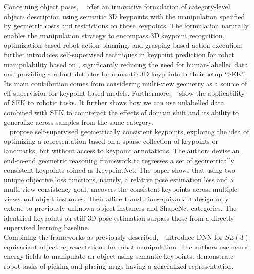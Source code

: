 Concerning object poses, \citeauthor{kpam}~\cite{kpam} offer an innovative formulation of category-level objects description
using semantic 3D keypoints with the manipulation specified by geometric costs and restrictions on those keypoints.
The formulation naturally enables the manipulation strategy to encompass 3D keypoint recognition,
optimization-based robot action planning, and grasping-based action execution.
\citeauthor{vecerik2020s3k}~\cite{vecerik2020s3k} further introduces self-supervised techniques in
keypoint prediction for robot manipulability based on \parencites{yen2020learning}{sermanet2017time}{li2018deepim}{xiang2017posecnn},
significantly reducing the need for human-labelled data and providing a robust detector for semantic 3D keypoints in their setup ``SEK''.
Its main contribution comes from considering multi-view geometry as a source of elf-supervision for keypoint-based models.
Furthermore, \citeauthor{vecerik2020s3k}~\cite{vecerik2020s3k} show the applicability of SEK to robotic tasks.
It further shows how we can use unlabelled data combined with SEK to counteract the effects of domain shift and its ability to generalize across samples from the same category.\\

\citeauthor{suwajanakorn2018discovery}~\cite{suwajanakorn2018discovery} propose self-supervised geometrically consistent keypoints, exploring the idea of optimizing a representation
based on a sparse collection of keypoints or landmarks, but without access to keypoint annotations. The authors devise an end-to-end geometric reasoning framework
to regresses a set of geometrically consistent keypoints coined as KeypointNet. The paper shows that using two unique objective loss
functions, namely, a relative pose
estimation loss and a multi-view consistency goal, uncovers the consistent keypoints across multiple views and object instances. Their affine translation-equivariant design may extend to
previously unknown object instances and ShapeNet \cite{chang2015shapenet} categories. The identified keypoints on stiff
3D pose estimation surpass those from a directly supervised learning baseline.\\

Combining the frameworks \parencites{florence2018dense}{mildenhall2021nerf}{nerf-Supervision}{kpam}{vecerik2020s3k} as previously described,
\citeauthor{ndfs}~\cite{ndfs} introduce \ac{DNN} for $SE(3)$ equivariant object representations for robot manipulation. The authors use neural energy fields to manipulate
an object using semantic keypoints. \citeauthor{ndfs} demonstrate robot tasks of picking and placing mugs having a generalized representation.

